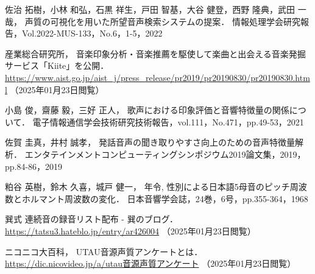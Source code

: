 \begin{thebibliography}{参考文献}
佐治 拓樹，小林 和弘，石黒 祥生，戸田 智基，大谷 健登，西野 隆典，武田 一哉，
声質の可視化を用いた所望音声検索システムの提案．
情報処理学会研究報告，Vol.2022-MUS-133，No.6，1-5，2022

産業総合研究所，
音楽印象分析・音楽推薦を駆使して楽曲と出会える音楽発掘サービス「Kiite」を公開．
\url{https://www.aist.go.jp/aist_j/press_release/pr2019/pr20190830/pr20190830.html}
（2025年01月23日閲覧）

小島 俊，齋藤 毅，三好 正人，
歌声における印象評価と音響特徴量の関係について．
電子情報通信学会技術研究技術報告，vol.111，No.471，pp.49-53，2021

佐賀 圭真，井村 誠孝，
発話音声の聞き取りやすさ向上のための音声特徴量解析．
エンタテインメントコンピューティングシンポジウム2019論文集，2019，pp.84-86，2019

粕谷 英樹，鈴木 久喜，城戸 健一，
年令, 性別による日本語5母音のピッチ周波数とホルマント周波数の変化．
日本音響学会誌，24巻，6号，pp.355-364，1968

巽式 連続音の録音リスト配布 - 巽のブログ．
\url{https://tatsu3.hateblo.jp/entry/ar426004}
（2025年01月23日閲覧）

ニコニコ大百科，
UTAU音源声質アンケートとは．
\url{https://dic.nicovideo.jp/a/utau音源声質アンケート}
（2025年01月23日閲覧）

\end{thebibliography}
